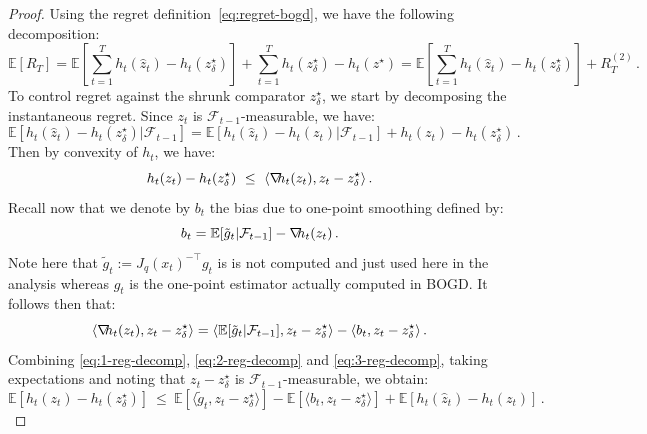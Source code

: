 \documentclass[a4paper,11pt,fullpage]{article}
\theoremstyle{plain}
\theoremstyle{definition}
\theoremstyle{plain}
\renewcommand{\leq}{~\le~}
\let\nablaold\nabla
\renewcommand{\nabla}{\nablaold\mkern-2.5mu}
\begin{document}
\begin{proof}
Using the regret definition~\eqref{eq:regret-bogd}, we have the following decomposition: 
\begin{equation}
\label{eq:regret-decomp1}
\mathbb{E}[R_T] = \mathbb{E}\left[\sum_{t=1}^T h_t(\hat{z}_t) - h_t(z^{\star}_{\delta})\right] 
+ \sum_{t=1}^T h_t(z^{\star}_{\delta}) - h_t(z^{\star})
= \mathbb{E}\left[\sum_{t=1}^T h_t(\hat{z}_t) - h_t(z^{\star}_{\delta})\right] + R_T^{(2)}\,.
\end{equation}
To control regret against the shrunk comparator $z_{\delta}^{\star}$, we start by decomposing the instantaneous regret. Since $z_t$ is $\mathcal{F}_{t-1}$-measurable, we have: 
\begin{equation}
\label{eq:1-reg-decomp}
\mathbb{E}[ h_t(\hat{z}_t) - h_t(z^{\star}_{\delta}) |\mathcal{F}_{t-1}] 
= \mathbb{E}[ h_t(\hat{z}_t) - h_t(z_t) |\mathcal{F}_{t-1}] 
+ h_t(z_t) -  h_t(z_{\delta}^{\star})\,.
\end{equation}
Then by convexity of $h_t$, we have: 
\begin{equation}
\label{eq:2-reg-decomp}
h_t(z_t) -  h_t(z_{\delta}^{\star}) \leq \langle \nabla h_t(z_t), z_t- z_{\delta}^{\star} \rangle\,.
\end{equation}
Recall now that we denote by $b_t$ the bias due to one-point smoothing defined by: 
\begin{equation*}
b_t = \mathbb{E}[\tilde{g}_t|\mathcal{F}_{t-1}] - \nabla h_t(z_t)\,.
\end{equation*}
Note here that $\tilde{g}_t := J_q(x_t)^{-\top} g_t$ is is not computed and just used here in the analysis whereas $g_t$ is the one-point estimator actually computed in BOGD. 
It follows then that: 
\begin{equation}
\label{eq:3-reg-decomp}
\langle \nabla h_t(z_t), z_t - z_{\delta}^{\star} \rangle 
= \langle \mathbb{E}[\tilde{g}_t|\mathcal{F}_{t-1}], z_t - z_{\delta}^{\star}\rangle - \langle b_t, z_t - z_{\delta}^{\star}\rangle\,.
\end{equation}
Combining \eqref{eq:1-reg-decomp}, \eqref{eq:2-reg-decomp} and \eqref{eq:3-reg-decomp}, taking expectations and noting that $z_t - z_{\delta}^{\star}$ is $\mathcal{F}_{t-1}$-measurable, we obtain: 
\begin{equation*}
\mathbb{E}[h_t(z_t) -  h_t(z_{\delta}^{\star})] 
\leq  \mathbb{E}[\langle \tilde{g}_t, z_t - z_{\delta}^{\star}\rangle] - \mathbb{E}[\langle b_t, z_t - z_{\delta}^{\star}\rangle] + \mathbb{E}[h_t(\hat{z}_t) - h_t(z_t)]\,.
\end{equation*}

\end{proof}
\end{document}
